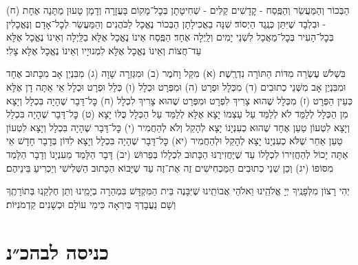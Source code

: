 (ח) הַבְּכוֹר וְהַמַּעֲשֵׂר וְהַפֶּֽסַח - קׇדָשִׁים קַלִּים - שְׁחִיטָתָן בְּכׇל־מָקוֹם בָּעֲזָרָה \middot וְדָמָן טָעוּן מַתָּנָה אֶחָת - וּבִלְבָד שֶׁיִּתֵּן כְּנֶֽגֶד הַיְסוֹד׃ שִׁנָּה בַאֲכִילָתָן \middot הַבְּכוֹר נֶאֱכָל לַכֹּהֲנִים \middot וְהַמַּעֲשֵׂר לְכׇל־אָדָם \middot וְנֶּאֱכָלִין בְּכׇל־הָעִיר בְּכׇל־מַאֲכָל לִשְׁנֵי יָמִים וְלַֽיְלָה אֶחָד׃ הַפֶּֽסַח אֵינוֹ נֶאֱכָל אֶלָּא בַלַּֽיְלָה וְאֵינוֹ נֶאֱכָל אֶלָּא עַד־חֲצוֹת וְאֵינוֹ נֶאֱכָל אֶלָּא לִמְנוּיָיו וְאֵינוֹ נֶאֱכָל אֶלָּא צָלִי׃

בִּשְׁלֹשׁ עֶשְׂרֵה מִדּוֹת הַתּוֹרָה נִדְרֶֽשֶׁת׃\hfill \break
(א) מִקַּל וָחֹמֶר (ב) וּמִגְּזֵרָה שָׁוָה (ג) מִבִּנְיַן אָב מִכָּתוּב אֶחָד \middot וּמִבִּנְיַן אָב מִשְּׁנֵי כְתוּבִים (ד) מִכְּלָל וּפְרָט (ה) וּמִפְּרָט וּכְלָל (ו) כְּלָל וּפְרָט וּכְלָל \middot אֵי אַתָּה דָן אֶלָּא כְּעֵין הַפְּרָט (ז) מִכְּלָל שֶׁהוּא צָרִיךְ לִפְרָט \middot וּמִפְּרָט שֶׁהוּא צָרִיךְ לִכְלָל (ח) כׇּל־דָּבָר שֶׁהָיָה בִּכְלָל וְיָצָא מִן הַכְּלָל לְלַמֵּד \middot לֹא לְלַמֵּד עַל עַצְמוֹ יָצָא אֶלָּא לְלַמֵּד עַל הַכְּלָל כֻּלּוֹ יָצָא (ט) כׇּל־דָּבָר שֶׁהָיָה בִּכְלָל וְיָצָא לִטְעוֹן טַעַן אֶחָד שֶׁהוּא כְעִנְיָנוֹ \middot יָצָא לְהָקֵל וְלֹא לְהַחֲמִיר (י) כׇּל־דָּבָר שֶׁהָיָה בִּכְלָל וְיָצָא לִטְעוֹן טַעַן אַחֵר שֶׁלֹּא כְעִנְיָנוֹ \middot יָצָא לְהָקֵל וּלְהַחֲמִיר (יא) כׇּל־דָּבָר שֶׁהָיָה בִּכְלָל וְיָצָא לִדּוֹן בְּדָבָר חָדָשׁ \middot אֵי אַתָּה יָכוֹל לְהַחֲזִירוֹ לִכְלָלוֹ עַד שֶׁיַּחֲזִירֶנּוּ הַכָּתוּב לִכְלָלוֹ בְּפֵרוּשׁ (יב) דָּבָר הַלָּמֵד מֵעִנְיָנוֹ \middot וְדָבָר הַלָּמֵד מִסּוֹפוֹ (יג) וְכֵן שְׁנֵי כְתוּבִים הַמַּכְחִישִׁים זֶה אֶת־זֶה \middot עַד שֶׁיָּבוֹא הַכָּתוּב הַשְּׁלִישִׁי וְיַכְרִיעַ בֵּינֵיהֶם׃

יְהִי רָצוֹן מִלְּפָנֶֽיךָ יְיָ אֱלֹהֵֽינוּ וֵאלֹהֵי אֲבוֹתֵֽינוּ שֶׁיִּבָּנֶה בֵּית הַמִּקְדָּשׁ בִּמְהֵרָה בְיָמֵֽינוּ וְתֵן חֶלְקֵֽנוּ בְּתוֹרָתֶֽךָ \middot וְשָׁם נַעֲבׇדְךָ בְּיִרְאָה כִּימֵי עוֹלָם וּכְשָׁנִים קַדְמֹנִיּוֹת׃

\rabbiskaddish

\section[כניסה לבהכ״נ]{ כניסה לבהכ״נ }


